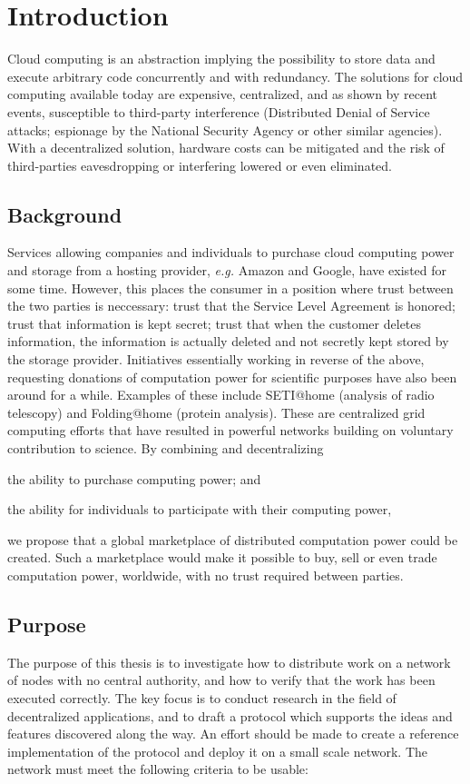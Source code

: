 \chapter{Introduction}
Cloud computing is an abstraction implying the possibility to store data and execute arbitrary code concurrently and with redundancy. The solutions for cloud computing available today are expensive, centralized, and as shown by recent events, susceptible to third-party interference (Distributed Denial of Service attacks; espionage by the National Security Agency or other similar agencies). With a decentralized solution, hardware costs can be mitigated and the risk of third-parties eavesdropping or interfering lowered or even eliminated.

\section{Background}
Services allowing companies and individuals to purchase cloud computing power and storage from a hosting provider, \emph{e.g.} Amazon and Google, have existed for some time. However, this places the consumer in a position where trust between the two parties is neccessary: trust that the Service Level Agreement is honored; trust that information is kept secret; trust that when the customer deletes information, the information is actually deleted and not secretly kept stored by the storage provider. Initiatives essentially working in reverse of the above, requesting donations of computation power for scientific purposes have also been around for a while. Examples of these include SETI@home (analysis of radio telescopy) and Folding@home (protein analysis). These are centralized grid computing efforts that have resulted in powerful networks building on voluntary contribution to science. By combining and decentralizing
\begin{inparaenum}
\item the ability to purchase computing power; and
\item the ability for individuals to participate with their computing power,
\end{inparaenum}
we propose that a global marketplace of distributed computation power could be created. Such a marketplace would make it possible to buy, sell or even trade computation power, worldwide, with no trust required between parties.

\section{Purpose}
The purpose of this thesis is to investigate how to distribute work on a network of nodes with no central authority, and how to verify that the work has been executed correctly. The key focus is to conduct research in the field of decentralized applications, and to draft a protocol which supports the ideas and features discovered along the way. An effort should be made to create a reference implementation of the protocol and deploy it on a small scale network. The network must meet the following criteria to be usable:

